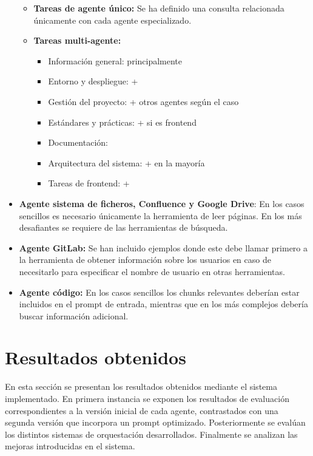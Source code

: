 \begin{itemize}
\begin{itemize}
    \item \textbf{Tareas de agente único: }Se ha definido una consulta relacionada únicamente con cada agente especializado. 
    \item \textbf{Tareas multi-agente:}
    \begin{itemize}
        \item Información general:  principalmente
        \item Entorno y despliegue:  + 
        \item Gestión del proyecto:  + otros agentes según el caso
        \item Estándares y prácticas:  +  si es frontend
        \item Documentación: 
        \item Arquitectura del sistema:  +  en la mayoría
        \item Tareas de frontend:  + 
    \end{itemize}
  \end{itemize}
\item\textbf{Agente sistema de ficheros, Confluence y Google Drive}: En los casos sencillos es necesario únicamente la herramienta de leer páginas. En los más desafiantes se requiere de las herramientas de búsqueda.
\item\textbf{Agente GitLab: }Se han incluido ejemplos donde este debe llamar primero a la herramienta de obtener información sobre los usuarios en caso de necesitarlo para especificar el nombre de usuario en otras herramientas.
\item\textbf{Agente código: }En los casos sencillos los chunks relevantes deberían estar incluidos en el prompt de entrada, mientras que en los más complejos debería buscar información adicional. 
\end{itemize}
\section{Resultados obtenidos}
En esta sección se presentan los resultados obtenidos mediante el sistema implementado. En primera instancia se exponen los resultados de evaluación correspondientes a la versión inicial de cada agente, contrastados con una segunda versión que incorpora un prompt optimizado. Posteriormente se evalúan los distintos sistemas de orquestación desarrollados. Finalmente se analizan las mejoras introducidas en el sistema.
